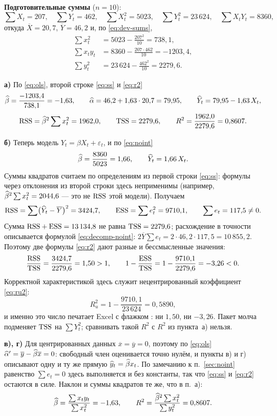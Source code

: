 \begin{solution}
\textbf{Подготовительные суммы} ($n = 10$):
\[
  \textstyle\sum X_t = 207,\quad \sum Y_t = 462,\quad
  \sum X_t^2 = 5023,\quad \sum Y_t^2 = 23\,624,\quad \sum X_tY_t = 8360,
\]
откуда $\overline{X} = 20{,}7$, $\overline{Y} = 46{,}2$ и, по
\eqref{eq:dev-sums},
\[
\begin{aligned}
  \sum x_t^2  &= 5023 - \frac{207^2}{10} = 738{,}1, \\[2pt]
  \sum x_ty_t &= 8360 - \frac{207\cdot 462}{10} = -1203{,}4, \\[2pt]
  \sum y_t^2  &= 23\,624 - \frac{462^2}{10} = 2279{,}6 .
\end{aligned}
\]

\medskip
\textbf{а)} По \eqref{eq:ols}, второй строке \eqref{eq:ss} и \eqref{eq:r2}
\[
  \widehat{\beta} = \frac{-1203{,}4}{738{,}1} = -1{,}63,
  \qquad
  \widehat{\alpha} = 46{,}2 + 1{,}63\cdot 20{,}7 = 79{,}95,
  \qquad
  \widehat{Y}_t = 79{,}95 - 1{,}63\,X_t,
\]
\[
  \mathrm{RSS} = \widehat{\beta}^2\sum x_t^2 = 1962{,}0,
  \qquad
  \mathrm{TSS} = 2279{,}6,
  \qquad
  R^2 = \frac{1962{,}0}{2279{,}6} = 0{,}8607 .
\]

\medskip
\textbf{б)} Теперь модель $Y_t = \beta X_t + \varepsilon_t$, и по
\eqref{eq:noint}
\[
  \widehat{\beta} = \frac{8360}{5023} = 1{,}66,
  \qquad
  \widehat{Y}_t = 1{,}66\,X_t .
\]
Суммы квадратов считаем по определениям из первой строки \eqref{eq:ss}:
формулы через отклонения из второй строки здесь неприменимы (например,
$\widehat{\beta}^2\sum x_t^2 = 2044{,}6$ — это не $\mathrm{RSS}$ этой модели). Получаем
\[
  \mathrm{RSS} = \sum\bigl(\widehat{Y}_t - \overline{Y}\bigr)^2 = 3424{,}7,
  \qquad
  \mathrm{ESS} = \sum e_t^2 = 9710{,}1,
  \qquad
  \sum e_t = 117{,}5 \neq 0 .
\]
Сумма $\mathrm{RSS} + \mathrm{ESS} = 13\,134{,}8$ не равна $\mathrm{TSS} = 2279{,}6$; расхождение в
точности описывается формулой \eqref{eq:decomp-noint}:
$2\overline{Y}\sum e_t = 2\cdot 46{,}2\cdot 117{,}5 = 10\,855{,}2$. Поэтому две
формулы \eqref{eq:r2} дают разные и бессмысленные значения:
\[
  \frac{\mathrm{RSS}}{\mathrm{TSS}} = \frac{3424{,}7}{2279{,}6} = 1{,}50 > 1,
  \qquad
  1 - \frac{\mathrm{ESS}}{\mathrm{TSS}} = 1 - \frac{9710{,}1}{2279{,}6} = -3{,}26 < 0 .
\]
Корректной характеристикой здесь служит нецентрированный коэффициент
\eqref{eq:ru2}:
\[
  R_u^2 = 1 - \frac{9710{,}1}{23\,624} = 0{,}5890 ,
\]
и именно это число печатает Excel с флажком : ни
$1{,}50$, ни $-3{,}26$. Пакет молча подменяет $\mathrm{TSS}$ на $\sum Y_t^2$; сравнивать
такой $R^2$ с $R^2$ из пункта~а) нельзя.

\medskip
\textbf{в), г)} Для центрированных данных $\overline{x} = \overline{y} = 0$,
поэтому по \eqref{eq:ols} $\widehat{\alpha}' = \overline{y} - \widehat{\beta}\overline{x} = 0$:
свободный член оценивается точно нулём, и пункты в) и г) описывают одну и ту же
прямую $\widehat{y}_t = \widehat{\beta} x_t$. По замечанию к п.~\ref{sec:noint} равенство
$\sum e_t = 0$ здесь выполняется и без константы, так что \eqref{eq:ss} и
\eqref{eq:r2} остаются в силе. Наклон и суммы квадратов те же, что в п.~а):
\[
  \widehat{\beta} = \frac{\sum x_ty_t}{\sum x_t^2} = -1{,}63,
  \qquad
  R^2 = \frac{\widehat{\beta}^2\sum x_t^2}{\sum y_t^2} = 0{,}8607 .
\]


\end{solution}
